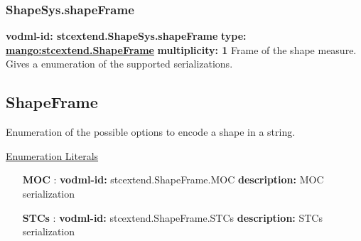     \subsubsection{ShapeSys.shapeFrame}
      \textbf{vodml-id: stcextend.ShapeSys.shapeFrame} \newline
      \textbf{type: \hyperref[sect:stcextend.ShapeFrame]{mango:stcextend.ShapeFrame}} \newline
      \textbf{multiplicity: 1} \newline 
      Frame of the shape measure. Gives a enumeration of the supported serializations.

  \subsection{ShapeFrame}
  \label{sect:stcextend.ShapeFrame}

  Enumeration of the possible options to encode a shape in a string.

  \noindent \underline{Enumeration Literals}
  \vspace{-\parsep}
  \small
  \begin{itemize}
  
    \item[\textbf{MOC}]: \textbf{vodml-id:} stcextend.ShapeFrame.MOC \newline
          \textbf{description:} MOC serialization
    \item[\textbf{STCs}]: \textbf{vodml-id:} stcextend.ShapeFrame.STCs \newline
          \textbf{description:} STCs serialization
  \end{itemize}
  \normalsize
